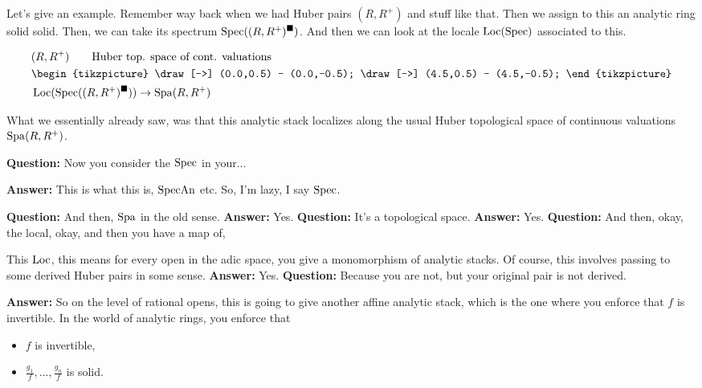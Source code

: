 \begin{example} \label{ex:22-huber-pair}

Let's give an example. Remember way back when we had Huber pairs $(R, R^{+})$ and stuff like that. Then we assign to this an analytic ring solid  solid. Then, we can take its spectrum $\operatorname{Spec}((R, R^{+})^\blacksquare)$. And then we can look at the locale $\operatorname{Loc}(\operatorname{Spec})$ associated to this.

\[
\begin{aligned}
    &(R, R^{+}) \quad \quad \text{Huber top. space of cont. valuations} \\
    &\begin{tikzpicture}
        \draw[->] (0.0,0.5) -- (0.0,-0.5);
        \draw[->] (4.5,0.5) -- (4.5,-0.5);
    \end{tikzpicture} \\
    &\Loc(\Spec((R, R^{+})^\solid)) \rightarrow \Spa(R, R^{+})
\end{aligned}
\]

 What we essentially already saw, was that this analytic stack localizes along the usual Huber topological space of continuous valuations $\operatorname{Spa}(R, R^{+})$.
\end{example}

\textbf{Question:} Now you consider the $\operatorname{Spec}$ in your...

\textbf{Answer:} This is what this is,  $\operatorname{SpecAn}$ etc. So, I'm lazy, I say $\operatorname{Spec}$.

\textbf{Question:} And then, $\operatorname{Spa}$ in the old sense.
\textbf{Answer:} Yes. 
\textbf{Question:} It's a topological space.
\textbf{Answer:} Yes. 
\textbf{Question:} And then, okay, the local, okay, and then you have a map of, 

This $\operatorname{Loc}$, this means for every open in the adic space, you give a monomorphism of analytic stacks. Of course, this involves passing to some derived Huber pairs in some sense.
\textbf{Answer:} Yes. 
\textbf{Question:} Because you are not, but your original pair is not derived.

\textbf{Answer:} So on the level of rational opens, this is going to give another affine analytic stack, which is the one where you enforce that $f$ is invertible. In the world of analytic rings, you enforce that 
\begin{itemize}
\item $f$ is invertible,
\item $\frac{g_1}{f}, ..., \frac{g_n}{f}$ is solid.
\end{itemize}

